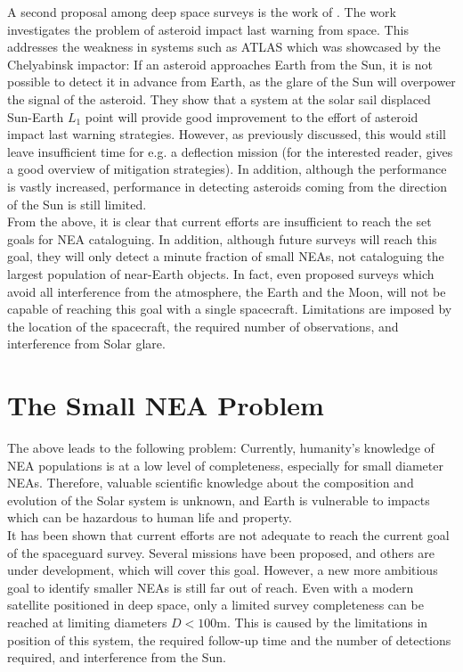 A second proposal among deep space surveys is the work of \cite{ThesisOlga}. The work investigates the problem of asteroid impact last warning from space. This addresses the weakness in systems such as ATLAS which was showcased by the Chelyabinsk impactor: If an asteroid approaches Earth from the Sun, it is not possible to detect it in advance from Earth, as the glare of the Sun will overpower the signal of the asteroid. They show that a system at the solar sail displaced Sun-Earth $L_1$ point will provide good improvement to the effort of asteroid impact last warning strategies. However, as previously discussed, this would still leave insufficient time for e.g. a deflection mission (for the interested reader, \cite{DefendingEarth} gives a good overview of mitigation strategies). In addition, although the performance is vastly increased, performance in detecting asteroids coming from the direction of the Sun is still limited.\\

From the above, it is clear that current efforts are insufficient to reach the set goals for NEA cataloguing. In addition, although future surveys will reach this goal, they will only detect a minute fraction of small NEAs, not cataloguing the largest population of near-Earth objects. In fact, even proposed surveys which avoid all interference from the atmosphere, the Earth and the Moon, will not be capable of reaching this goal with a single spacecraft. Limitations are imposed by the location of the spacecraft, the required number of observations, and interference from Solar glare.



\section{The Small NEA Problem}
\label{sec:problemstatement}
The above leads to the following problem: Currently, humanity's knowledge of NEA populations is at a low level of completeness, especially for small diameter NEAs. Therefore, valuable scientific knowledge about the composition and evolution of the Solar system is unknown, and Earth is vulnerable to impacts which can be hazardous to human life and property. \\

It has been shown that current efforts are not adequate to reach the current goal of the spaceguard survey. Several missions have been proposed, and others are under development, which will cover this goal. However, a new more ambitious goal to identify smaller NEAs is still far out of reach. Even with a modern satellite positioned in deep space, only a limited survey completeness can be reached at limiting diameters $D < 100 \mathrm{m}$. This is caused by the limitations in position of this system, the required follow-up time and the number of detections required, and interference from the Sun.

